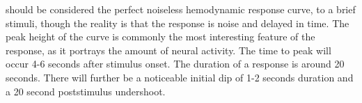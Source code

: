  should be considered the perfect noiseless hemodynamic response curve, to a brief stimuli, though the reality is that the response is noise and delayed in time. The peak height of the curve is commonly the most interesting feature of the response, as it portrays the amount of neural activity. The time to peak will occur 4-6 seconds after stimulus onset. The duration of a response is around 20 seconds. There will further be a noticeable initial dip of 1-2 seconds duration and a 20 second poststimulus undershoot. \cite{Poldrack2011}    \\  